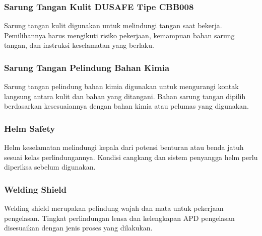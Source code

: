 
\Needspace{6.8cm}
\subsubsection{Sarung Tangan Kulit DUSAFE Tipe CBB008}

Sarung tangan kulit digunakan untuk melindungi tangan saat bekerja. Pemilihannya harus mengikuti risiko pekerjaan, kemampuan bahan sarung tangan, dan instruksi keselamatan yang berlaku.


\Needspace{6.8cm}
\subsubsection{Sarung Tangan Pelindung Bahan Kimia}

Sarung tangan pelindung bahan kimia digunakan untuk mengurangi kontak langsung antara kulit dan bahan yang ditangani. Bahan sarung tangan dipilih berdasarkan kesesuaiannya dengan bahan kimia atau pelumas yang digunakan.


\Needspace{6.8cm}
\subsubsection{Helm Safety}

Helm keselamatan melindungi kepala dari potensi benturan atau benda jatuh sesuai kelas perlindungannya. Kondisi cangkang dan sistem penyangga helm perlu diperiksa sebelum digunakan.


\Needspace{6.8cm}
\subsubsection{Welding Shield}

Welding shield merupakan pelindung wajah dan mata untuk pekerjaan pengelasan. Tingkat perlindungan lensa dan kelengkapan APD pengelasan disesuaikan dengan jenis proses yang dilakukan.

